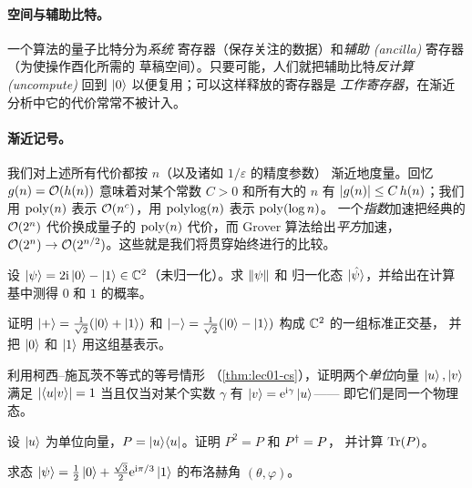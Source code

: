 \paragraph{空间与辅助比特。} 一个算法的量子比特分为\emph{系统}
寄存器（保存关注的数据）和\emph{辅助 (ancilla)} 寄存器（为使操作酉化所需的
草稿空间）。只要可能，人们就把辅助比特\emph{反计算 (uncompute)}
回到 $\ket{0}$ 以便复用；可以这样释放的寄存器是
\emph{工作寄存器}，在渐近分析中它的代价常常不被计入。

\paragraph{渐近记号。} 我们对上述所有代价都按 $n$（以及诸如 $1/\varepsilon$ 的精度参数）
渐近地度量。回忆 $g(n)=\mathcal{O}(h(n))$
意味着对某个常数 $C>0$ 和所有大的 $n$ 有 $\left\lvert g(n) \right\rvert\le C\,h(n)$；我们用
$\operatorname{poly}(n)$ 表示 $\mathcal{O}(n^{c})$，用 $\operatorname{polylog}(n)$ 表示 $\operatorname{poly}(\log n)$。
一个\emph{指数}加速把经典的 $\mathcal{O}(2^{n})$ 代价换成量子的
$\operatorname{poly}(n)$ 代价，而 Grover 算法给出\emph{平方}加速，
$\mathcal{O}(2^{n})\to\mathcal{O}(2^{n/2})$。这些就是我们将贯穿始终进行的比较。

\exercisesection
\begin{exercise}\label{ex:lec01-1}
设 $\ket{\psi}=2\mathrm{i}\ket{0}-\ket{1}\in\mathbb{C}^{2}$（未归一化）。求 $\left\lVert \psi \right\rVert$ 和
归一化态 $\ket{\hat\psi}$，并给出在计算基中测得 $0$
和 $1$ 的概率。
\end{exercise}

\begin{exercise}\label{ex:lec01-2}
证明 $\ket{+}=\tfrac{1}{\sqrt2}(\ket{0}+\ket{1})$ 和
$\ket{-}=\tfrac{1}{\sqrt2}(\ket{0}-\ket{1})$ 构成 $\mathbb{C}^{2}$ 的一组标准正交基，
并把 $\ket{0}$ 和 $\ket{1}$ 用这组基表示。
\end{exercise}

\begin{exercise}\label{ex:lec01-3}
利用柯西--施瓦茨不等式的等号情形
（\cref{thm:lec01-cs}），证明两个\emph{单位}向量 $\ket{u},\ket{v}$ 满足
$\left\lvert \braket{u|v} \right\rvert=1$ 当且仅当对某个实数 $\gamma$ 有 $\ket{v}=\mathrm{e}^{\mathrm{i}\gamma}\ket{u}$——
即它们是同一个物理态。
\end{exercise}

\begin{exercise}\label{ex:lec01-4}
设 $\ket{u}$ 为单位向量，$P=\ket{u}\!\bra{u}$。证明 $P^{2}=P$ 和 $P^{\dagger}=P$，
并计算 $\operatorname{Tr}(P)$。
\end{exercise}

\begin{exercise}\label{ex:lec01-5}
求态
$\ket{\psi}=\tfrac{1}{2}\ket{0}+\tfrac{\sqrt3}{2}\mathrm{e}^{\mathrm{i}\pi/3}\ket{1}$ 的布洛赫角 $(\theta,\varphi)$。
\end{exercise}

